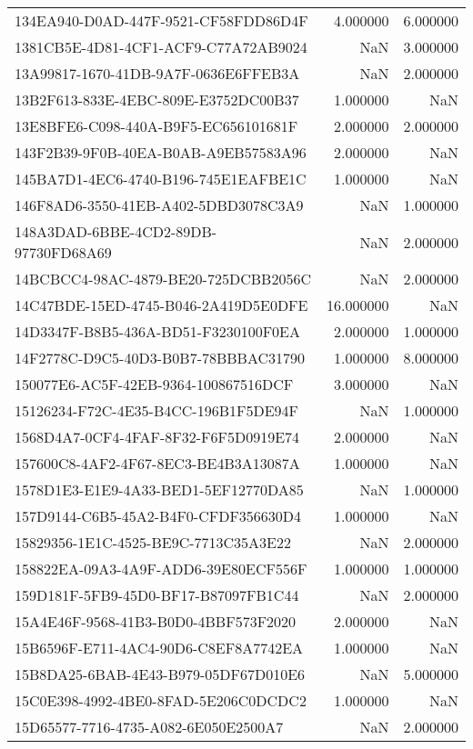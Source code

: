\begin{tabular}{lrr}
134EA940-D0AD-447F-9521-CF58FDD86D4F & 4.000000 & 6.000000 \\
1381CB5E-4D81-4CF1-ACF9-C77A72AB9024 & NaN & 3.000000 \\
13A99817-1670-41DB-9A7F-0636E6FFEB3A & NaN & 2.000000 \\
13B2F613-833E-4EBC-809E-E3752DC00B37 & 1.000000 & NaN \\
13E8BFE6-C098-440A-B9F5-EC656101681F & 2.000000 & 2.000000 \\
143F2B39-9F0B-40EA-B0AB-A9EB57583A96 & 2.000000 & NaN \\
145BA7D1-4EC6-4740-B196-745E1EAFBE1C & 1.000000 & NaN \\
146F8AD6-3550-41EB-A402-5DBD3078C3A9 & NaN & 1.000000 \\
148A3DAD-6BBE-4CD2-89DB-97730FD68A69 & NaN & 2.000000 \\
14BCBCC4-98AC-4879-BE20-725DCBB2056C & NaN & 2.000000 \\
14C47BDE-15ED-4745-B046-2A419D5E0DFE & 16.000000 & NaN \\
14D3347F-B8B5-436A-BD51-F3230100F0EA & 2.000000 & 1.000000 \\
14F2778C-D9C5-40D3-B0B7-78BBBAC31790 & 1.000000 & 8.000000 \\
150077E6-AC5F-42EB-9364-100867516DCF & 3.000000 & NaN \\
15126234-F72C-4E35-B4CC-196B1F5DE94F & NaN & 1.000000 \\
1568D4A7-0CF4-4FAF-8F32-F6F5D0919E74 & 2.000000 & NaN \\
157600C8-4AF2-4F67-8EC3-BE4B3A13087A & 1.000000 & NaN \\
1578D1E3-E1E9-4A33-BED1-5EF12770DA85 & NaN & 1.000000 \\
157D9144-C6B5-45A2-B4F0-CFDF356630D4 & 1.000000 & NaN \\
15829356-1E1C-4525-BE9C-7713C35A3E22 & NaN & 2.000000 \\
158822EA-09A3-4A9F-ADD6-39E80ECF556F & 1.000000 & 1.000000 \\
159D181F-5FB9-45D0-BF17-B87097FB1C44 & NaN & 2.000000 \\
15A4E46F-9568-41B3-B0D0-4BBF573F2020 & 2.000000 & NaN \\
15B6596F-E711-4AC4-90D6-C8EF8A7742EA & 1.000000 & NaN \\
15B8DA25-6BAB-4E43-B979-05DF67D010E6 & NaN & 5.000000 \\
15C0E398-4992-4BE0-8FAD-5E206C0DCDC2 & 1.000000 & NaN \\
15D65577-7716-4735-A082-6E050E2500A7 & NaN & 2.000000 \\

\end{tabular}
